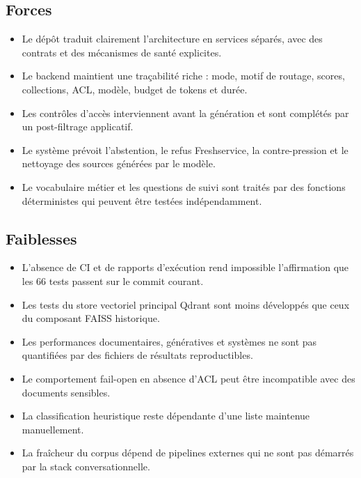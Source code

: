 \subsection{Forces}
\begin{itemize}
\item Le dépôt traduit clairement l’architecture en services séparés, avec des contrats et des mécanismes de santé explicites.
\item Le backend maintient une traçabilité riche : mode, motif de routage, scores, collections, ACL, modèle, budget de tokens et durée.
\item Les contrôles d’accès interviennent avant la génération et sont complétés par un post-filtrage applicatif.
\item Le système prévoit l’abstention, le refus Freshservice, la contre-pression et le nettoyage des sources générées par le modèle.
\item Le vocabulaire métier et les questions de suivi sont traités par des fonctions déterministes qui peuvent être testées indépendamment.
\end{itemize}
\subsection{Faiblesses}
\begin{itemize}
\item L’absence de CI et de rapports d’exécution rend impossible l’affirmation que les 66 tests passent sur le commit courant.
\item Les tests du store vectoriel principal Qdrant sont moins développés que ceux du composant FAISS historique.
\item Les performances documentaires, génératives et systèmes ne sont pas quantifiées par des fichiers de résultats reproductibles.
\item Le comportement fail-open en absence d’ACL peut être incompatible avec des documents sensibles.
\item La classification heuristique reste dépendante d’une liste maintenue manuellement.
\item La fraîcheur du corpus dépend de pipelines externes qui ne sont pas démarrés par la stack conversationnelle.
\end{itemize}
